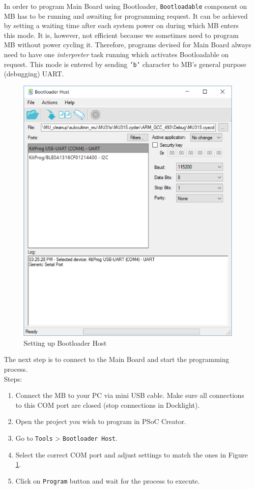 In order to program Main Board using Bootloader, \texttt{Bootloadable} component on MB has to be running and awaiting for programming request. It can be achieved by setting a waiting time after each system power on during which MB enters this mode. It is, however, not efficient because we sometimes need to program MB without power cycling it. Therefore, programs devised for Main Board always need to have one \textit{interpreter} task running which activates Bootloadable on request. This mode is entered by sending \texttt{'b'} character to MB's general purpose (debugging) UART.

\begin{figure}[htb]
    \centering
	  \includegraphics[width=0.6\linewidth]{figures/Bootloader_BLE.PNG}
	\caption{Setting up Bootloader Host}
	\label{fig:bootloader_host}
\end{figure}

The next step is to connect to the Main Board and start the programming process.\\
Steps:
\begin{enumerate}
	\item Connect the MB to your PC via mini USB cable. Make sure all connections to this COM port are closed (stop connections in Docklight).
	\item Open the project you wish to program in PSoC Creator.
	\item Go to \texttt{Tools} > \texttt{Bootloader Host}.
	\item Select the correct COM port and adjust settings to match the ones in Figure \ref{fig:bootloader_host}.
	\item Click on \texttt{Program} button and wait for the process to execute.
\end{enumerate}

